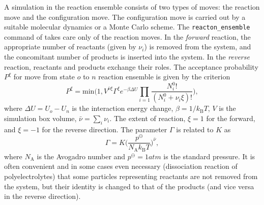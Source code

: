 A simulation in the reaction ensemble consists of two types of moves: the reaction move and the configuration move.
The configuration move is carried out by a suitable molecular dynamics or a Monte
Carlo scheme. The \verb!reacton_ensemble! command of {\es} takes care only of
the reaction moves.  In the \emph{forward} reaction, the appropriate number of
reactants (given by $\nu_i$) is removed
from the system, and the concomitant number of products 
is inserted into the system. In the \emph{reverse} reaction, 
reactants and products exchange their roles. The acceptance probability 
$P^{\xi}$ for move from state $o$ to $n$ reaction ensemble is given by the criterion~\cite{smith94a}
\begin{equation}
	P^{\xi} = \text{min}\biggl(1,V^{\bar\nu\xi}\Gamma^{\xi}e^{-\beta\Delta U}\prod_{i=1}\frac{N_i^0!}{(N_i^0+\nu_{i}\xi)!}
	\label{eq:Pacc}
	\biggr),
\end{equation}
where $\Delta U=U_o-U_n$ is the interaction energy change,
$\beta=1/k_\mathrm{B}T$, $V$ is the simulation box volume, $\bar\nu = \sum_i
\nu_i$. The extent of reaction, $\xi=1$ for the forward, and $\xi=-1$ for the
reverse direction.
The parameter $\Gamma$ is related to $K$ as
\begin{equation}
	\Gamma = K \biggl(\frac{p^{\ominus}}{N_{\mathrm{A}}k_\mathrm{B}T}\biggr)^{\bar\nu},
	  \label{eq:Gamma}
\end{equation}
where $N_{\mathrm{A}}$ is the Avogadro number and 
$p^{\ominus}=1\unit{atm}$ is the standard pressure.
It is often convenient and in some cases even necessary (dissociation reaction
of polyelectrolytes) that some particles representing reactants are not removed
from the system, but their identity is changed to that of the products (and
vice versa in the reverse direction).

